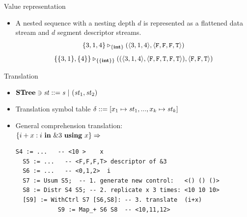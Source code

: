 \documentclass{beamer}
\begin{document}
\begin{frame}{Value representation}
\begin{itemize}
%	
	\item A nested sequence with a nesting depth $d$ is represented as a flattened data stream and $d$ segment descriptor streams. 
	$$\{3,1,4\} \tr_{\{\int\}} (\< 3,1,4 \'>, \< \F, \F,\F , \T \'>) $$
	$$\{\{3,1\}, \{4\}\} \tr_{\{\{\int\}\}} ((\< 3,1,4 \'>, \<\F,\F,\T,\F,\T \'>),\< \F, \F, \T \'>)  $$
	

\end{itemize}
\end{frame}


\begin{frame}[fragile]{Translation}
\begin{itemize}
	\item $\STree \ni \st ::= \s \ | \ (\st_1,\st_2) $
	\item Translation symbol table $\del ::= [x_1 \|-> \st_1,..., x_k \|-> {\st_k}] $
	\item General comprehension translation:\\
	$\{i+x : i \ \mathbf{in} \ \&3 \ \mathbf{using} \ x\} \Rightarrow$  
{\footnotesize
	\begin{lstlisting}[style=svcode-style]
  S4 := ...   -- <10 >    x
  S5 := ...   -- <F,F,F,T> descriptor of &3 
  S6 := ...   -- <0,1,2>  i
  S7 := Usum S5;  -- 1. generate new control:   <() () ()>
  S8 := Distr S4 S5; -- 2. replicate x 3 times: <10 10 10>
  [S9] := WithCtrl S7 [S6,S8]: -- 3. translate  (i+x)
            S9 := Map_+ S6 S8  -- <10,11,12>
\end{lstlisting}
}
\end{itemize}
\end{frame}
\end{document}
